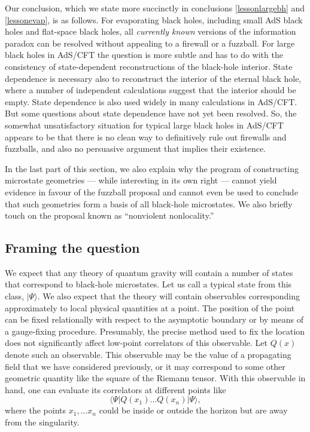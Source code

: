\documentclass[12pt]{article}
\def\qop{Q}
\begin{document}
Our conclusion, which we state more succinctly in conclusions \ref{lessonlargebh} and \ref{lessonevap}, is as follows. For evaporating black holes, including small AdS black holes and flat-space black holes, all {\em currently known} versions of the information paradox can be resolved without appealing to a firewall or a fuzzball. For large black holes in AdS/CFT  the question  is more subtle and has to do with the consistency of state-dependent reconstructions of the black-hole interior.  State dependence is necessary also to reconstruct the interior of the eternal black hole, where a number of independent calculations suggest that the interior should be empty. State dependence is also used widely in many calculations in AdS/CFT. But some questions about state dependence have not yet been resolved. So, the somewhat unsatisfactory situation for typical large black holes in AdS/CFT appears to be that there is no clean way to definitively rule out firewalls and fuzzballs, and also no persuasive argument that implies their existence.

In the last part of this section, we also explain why the program of constructing  microstate geometries --- while interesting in its own right --- cannot yield evidence in favour of the fuzzball proposal and cannot even be used to conclude that such geometries  form a basis of all black-hole microstates. We also briefly touch on the proposal known as ``nonviolent nonlocality.''






\subsection{Framing the question}

We expect that any theory of quantum gravity will contain a number of states that correspond to black-hole microstates. Let us call a typical state from this class, $|\Psi \rangle$. We also expect that the theory will contain
observables corresponding approximately to local physical quantities at a point.  The position of the point can be fixed relationally with respect to the asymptotic boundary or by means of a gauge-fixing procedure. Presumably, the precise method used to fix the location does not significantly  affect low-point correlators of this observable. Let $\qop(x)$ denote such an observable. This observable may be the value of a propagating field that we have considered previously, or it may correspond to some other geometric quantity like the square of the Riemann tensor. With this observable in hand, one can evaluate its correlators  at different points like
\[
\langle \Psi |  \qop(x_1) \ldots \qop(x_n) |\Psi \rangle,
\]
where the points $x_1, \ldots x_n$ could be inside or outside the horizon but are away from the singularity.
\end{document}
